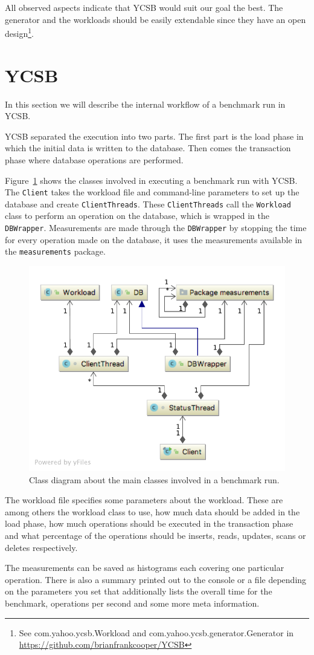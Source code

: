 All observed aspects indicate that YCSB would suit our goal the best.
The generator and the workloads should be easily extendable since they have an open design\footnote{See com.yahoo.ycsb.Workload and com.yahoo.ycsb.generator.Generator in \url{https://github.com/brianfrankcooper/YCSB}}.

\section{YCSB}
\label{ch:analysis:se:ycsb}
In this section we will describe the internal workflow of a benchmark run in YCSB.

YCSB separated the execution into two parts.
The first part is the load phase in which the initial data is written to the database.
Then comes the transaction phase where database operations are performed.

Figure~\ref{fig:basicYCSBWorkflow} shows the classes involved in executing a benchmark run with YCSB.
The \texttt{Client} takes the workload file and command-line parameters to set up the database and create \texttt{ClientThreads}.
These \texttt{ClientThreads} call the \texttt{Workload} class to perform an operation on the database,
which is wrapped in the \texttt{DBWrapper}.
Measurements are made through the \texttt{DBWrapper} by stopping the time for every operation made on the database,
it uses the measurements available in the \texttt{measurements} package.

\begin{figure}
  \centering
  \includegraphics[width=.75\textwidth]{images/benchmarks/basicYCSBWorkflow}
  \caption{Class diagram about the main classes involved in a benchmark run.}
  \label{fig:basicYCSBWorkflow}
\end{figure}

The workload file specifies some parameters about the workload.
These are among others the workload class to use,
how much data should be added in the load phase,
how much operations should be executed in the transaction phase and what percentage of the operations should be inserts, reads, updates, scans or deletes respectively.

The measurements can be saved as histograms each covering one particular operation.
There is also a summary printed out to the console or a file depending on the parameters you set that additionally lists the overall time for the benchmark, operations per second and some more meta information.
